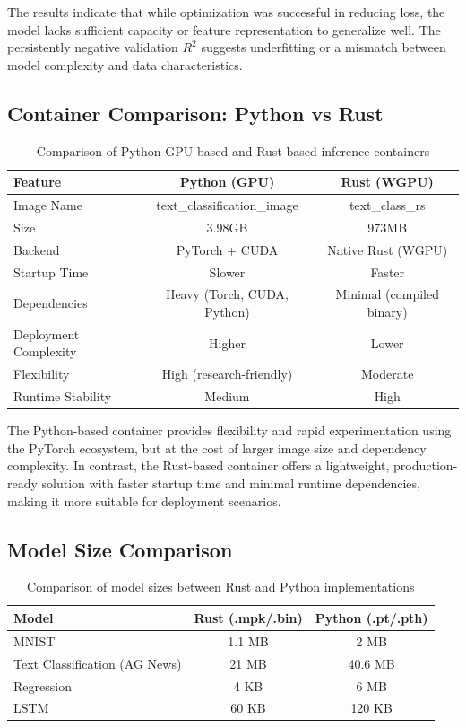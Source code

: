 \documentclass[10pt,a4paper,twocolumn]{article}
\begin{document}
The results indicate that while optimization was successful in reducing loss, the model lacks sufficient capacity or feature representation to generalize well. The persistently negative validation $R^2$ suggests underfitting or a mismatch between model complexity and data characteristics.




\newpage

\subsection{Container Comparison: Python vs Rust}

\begin{table}[t!]
\centering
\begin{tabular}{|l|c|c|}
\hline
\textbf{Feature} & \textbf{Python (GPU)} & \textbf{Rust (WGPU)} \\
\hline
Image Name & text\_classification\_image & text\_class\_rs \\
\hline
Size &  3.98GB &  973MB \\
\hline
Backend & PyTorch + CUDA & Native Rust (WGPU) \\
\hline
Startup Time & Slower & Faster \\
\hline
Dependencies & Heavy (Torch, CUDA, Python) & Minimal (compiled binary) \\
\hline
Deployment Complexity & Higher & Lower \\
\hline
Flexibility & High (research-friendly) & Moderate \\
\hline
Runtime Stability & Medium & High \\
\hline
\end{tabular}
\caption{Comparison of Python GPU-based and Rust-based inference containers}
\end{table}

\noindent
The Python-based container provides flexibility and rapid experimentation using the PyTorch ecosystem, but at the cost of larger image size and dependency complexity. In contrast, the Rust-based container offers a lightweight, production-ready solution with faster startup time and minimal runtime dependencies, making it more suitable for deployment scenarios.


\subsection{Model Size Comparison}

\begin{table}[t!]
\centering
\begin{tabular}{|l|c|c|}
\hline
\textbf{Model} & \textbf{Rust (.mpk/.bin)} & \textbf{Python (.pt/.pth)} \\
\hline
MNIST & 1.1 MB & 2 MB \\
\hline
Text Classification (AG News) & 21 MB & 40.6 MB \\
\hline
Regression & 4 KB & 6 MB \\
\hline
LSTM & 60 KB & 120 KB \\
\hline
\end{tabular}
\caption{Comparison of model sizes between Rust and Python implementations}
\end{table}
\end{document}
